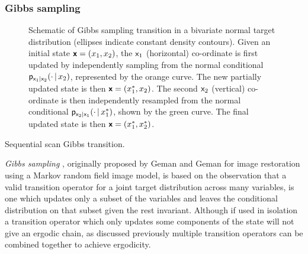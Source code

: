 
\subsubsection{Gibbs sampling}

\begin{figure}[!t]
\centering
{}
\caption[Gibbs sampling schematic.]{Schematic of Gibbs sampling transition in a bivariate normal target distribution (ellipses indicate constant density contours). Given an initial state $\boldsymbol{\mathsf{x}} = (x_1,x_2)$, the $\mathsf{x}_1$ (horizontal) co-ordinate is first updated by independently sampling from the normal conditional $\mathsf{p}_{\mathsf{x}_1|\mathsf{x}_2}(\cdot\operatorname{|} x_2)$, represented by the orange curve. The new partially updated state is then $\boldsymbol{\mathsf{x}} = (x_1^*, x_2)$. The second $\mathsf{x}_2$ (vertical) co-ordinate is then independently resampled from the normal conditional $\mathsf{p}_{\mathsf{x}_2|\mathsf{x}_1}(\cdot\operatorname{|} x_1^*)$, shown by the green curve. The final updated state is then $\boldsymbol{\mathsf{x}} = (x_1^*, x_2^*)$.}
\label{fig:gibbs-sampling}
\end{figure}

\begin{algorithm}[!t]
\caption{Sequential scan Gibbs transition.}
\label{alg:gibbs-sampling}

\end{algorithm}

\emph{Gibbs sampling} \citep{geman1984stochastic,gelfand1990sampling}, originally proposed by Geman and Geman for image restoration using a Markov random field image model, is based on the observation that a valid transition operator for a joint target distribution across many variables, is one which updates only a subset of the variables and leaves the conditional distribution on that subset given the rest invariant. Although if used in isolation a transition operator which only updates some components of the state will not give an ergodic chain, as discussed previously multiple transition operators can be combined together to achieve ergodicity. 

